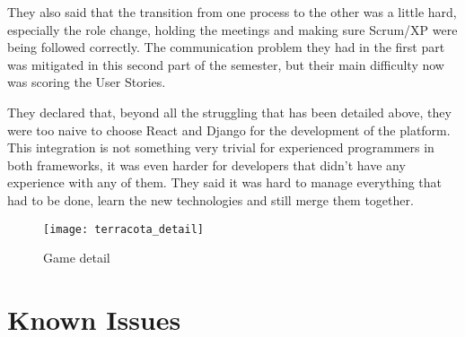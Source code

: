 They also said that the transition from one process to the other was a little hard, especially the role change, holding the meetings and making sure Scrum/XP were being followed correctly. The communication problem they had in the first part was mitigated in this second part of the semester, but their main difficulty now was scoring the User Stories.

They declared that, beyond all the struggling that has been detailed above, they were too naive to choose React and Django for the development of the platform. This integration is not something very trivial for experienced programmers in both frameworks, it was even harder for developers that didn't have any experience with any of them. They said it was hard to manage everything that had to be done, learn the new technologies and still merge them together.


\begin{figure}[h!]
\centering
\texttt{[image: terracota\_detail]}
\caption{Game detail}
\label {fig:game_detail}
\end{figure}

\section{Known Issues}
\label {sec:issues}

